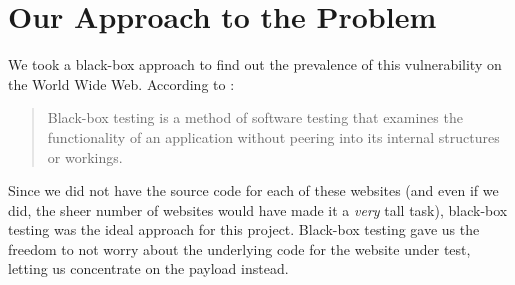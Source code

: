 \section[Approach]{Our Approach to the Problem}
\label{sys:appr}
We took a black-box approach to find out the prevalence of this vulnerability on the World Wide Web. According to \cite{wiki:Black-box_testing}:
\begin{quote}
	{Black-box testing is a method of software testing that examines the functionality of an application without peering into its internal structures or workings.}
\end{quote} 

Since we did not have the source code for each of these websites (and even if we did, the sheer number of websites would have made it a \emph{very} tall task), black-box testing was the ideal approach for this project.
Black-box testing gave us the freedom to not worry about the underlying code for the website under test, letting us concentrate on the payload instead.